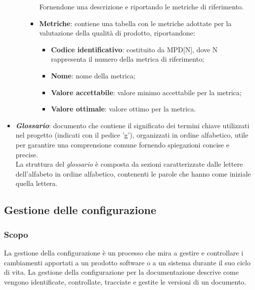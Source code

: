 \begin{itemize}
\begin{itemize}
\begin{itemize}
\begin{itemize}
                                                        \end{itemize}
                                                        Fornendone una descrizione e riportando le metriche di riferimento.
                                                        \item \textbf{Metriche}: contiene una tabella con le metriche adottate per la valutazione della qualità di prodotto, riportandone:
                                                        \begin{itemize}
                                                            \item \textbf{Codice identificativo}: costituito da MPD[N], dove N rappresenta il numero della metrica di riferimento;
                                                            \item \textbf{Nome}: nome della metrica;
                                                            \item \textbf{Valore accettabile}: valore minimo accettabile per la metrica;
                                                            \item \textbf{Valore ottimale}: valore ottimo per la metrica.
                                                        \end{itemize}
                                                    \end{itemize}
            \end{itemize}
            \item \textit{\textbf{Glossario}}: documento che contiene il significato dei termini chiave utilizzati nel progetto (indicati con il pedice 'g'), organizzati in ordine alfabetico, utile per garantire una comprensione comune fornendo spiegazioni concise e precise.
            \\La struttura del \textit{glossario} è composta da sezioni caratterizzate dalle lettere dell'alfabeto in ordine alfabetico, contenenti le parole che hanno come iniziale quella lettera.
        \end{itemize}

    \subsection{Gestione delle configurazione}
        \subsubsection{Scopo}
        La gestione della configurazione è un processo che mira a gestire e controllare i cambiamenti apportati
        a un prodotto software o a un sistema durante il suo ciclo di vita. La gestione della configurazione per
        la documentazione descrive come vengono identificate, controllate, tracciate e gestite le versioni di un
        documento.
